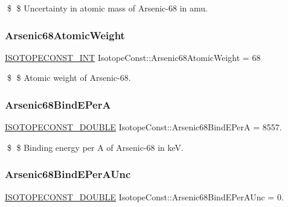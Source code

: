\$ \$ Uncertainty in atomic mass of Arsenic-\/68 in amu. \mbox{\label{group___isotope_const-_arsenic-_as68_gaf346a876e62aca2459c074ff4f77251b}} 
\subsubsection{\texorpdfstring{Arsenic68\+Atomic\+Weight}{Arsenic68AtomicWeight}}
{\footnotesize\ttfamily \mbox{\hyperlink{group___isotope_const-_macros_ga5f18360b3e99483a35c32d789e62621c}{I\+S\+O\+T\+O\+P\+E\+C\+O\+N\+S\+T\+\_\+\+I\+NT}} Isotope\+Const\+::\+Arsenic68\+Atomic\+Weight = 68}

\$ \$ Atomic weight of Arsenic-\/68. \mbox{\label{group___isotope_const-_arsenic-_as68_ga595fe607297680573f3f1fe477c6fdb9}} 
\subsubsection{\texorpdfstring{Arsenic68\+Bind\+E\+PerA}{Arsenic68BindEPerA}}
{\footnotesize\ttfamily \mbox{\hyperlink{group___isotope_const-_macros_ga8f45a7272ce02c0b4c65c44636ed719a}{I\+S\+O\+T\+O\+P\+E\+C\+O\+N\+S\+T\+\_\+\+D\+O\+U\+B\+LE}} Isotope\+Const\+::\+Arsenic68\+Bind\+E\+PerA = 8557.}

\$ \$ Binding energy per A of Arsenic-\/68 in keV. \mbox{\label{group___isotope_const-_arsenic-_as68_gad09fff5a1d117f56ff9101b51e39881a}} 
\subsubsection{\texorpdfstring{Arsenic68\+Bind\+E\+Per\+A\+Unc}{Arsenic68BindEPerAUnc}}
{\footnotesize\ttfamily \mbox{\hyperlink{group___isotope_const-_macros_ga8f45a7272ce02c0b4c65c44636ed719a}{I\+S\+O\+T\+O\+P\+E\+C\+O\+N\+S\+T\+\_\+\+D\+O\+U\+B\+LE}} Isotope\+Const\+::\+Arsenic68\+Bind\+E\+Per\+A\+Unc = 0.}

